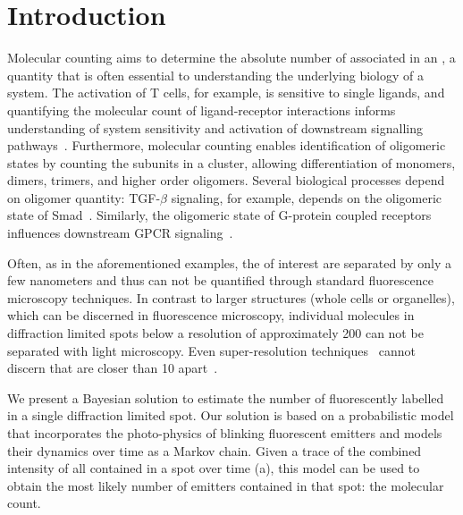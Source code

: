 \section{Introduction}



%
Molecular counting aims to determine the absolute number of \smallobjects
associated in an \object, a quantity that is often essential to understanding
the underlying biology of a system.
  The activation of T cells, for example, is sensitive to single ligands, and
  quantifying the molecular count of ligand-receptor interactions informs
  understanding of system sensitivity and activation of downstream signalling 
  pathways~\citep{irvine_2002}.
  Furthermore, molecular counting enables identification of oligomeric states by
  counting the subunits in a cluster, allowing differentiation of monomers, dimers,
  trimers, and higher order oligomers.
  Several biological processes depend on oligomer quantity: TGF-$\beta$ signaling,
  for example, depends on the oligomeric state of Smad~\citep{inman_2002,
  moustakas_2002}.
  Similarly, the oligomeric state of G-protein coupled receptors influences
  downstream GPCR signaling~\citep{felce_2018, breitwieser_2004}.

%
Often, as in the aforementioned examples, the \smallobjects of interest are separated by only a few
nanometers and thus can not be quantified through standard fluorescence
microscopy techniques.
  In contrast to larger structures (whole cells or organelles), which can
  be discerned in fluorescence microscopy, individual molecules in
  diffraction limited spots below a resolution of approximately 200 \nanometer can not
  be separated with light microscopy.
  Even super-resolution techniques~\citep{betzig_2006,rust_2006} cannot discern 
  \smallobjects that are closer than 10 \nanometer apart~\citep{valli_seeing_2021}.

%
We present a Bayesian solution to estimate the number of fluorescently labelled
\smallobjects in a single diffraction limited spot.
  Our solution is based on a probabilistic model that incorporates the
  photo-physics of blinking fluorescent emitters and models their dynamics over
  time as a Markov chain.
  Given a trace of the combined intensity of all \smallobjects contained in a
  spot over time (a), this model can be used to obtain the 
  most likely number of emitters contained in that spot: the molecular count.

